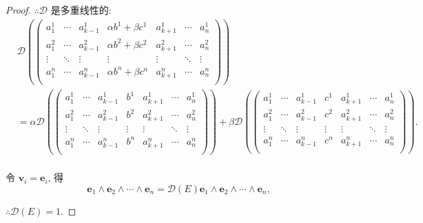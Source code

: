 \documentclass{ctexart}
\begin{document}
\begin{proof}
    $\therefore\mathcal{D}$ 是多重线性的:
    \begin{align*}
        & \mathcal{D}\left(\begin{pmatrix}
            a_1^1 & \cdots & a_{k-1}^1 & \alpha b^1+\beta c^1 & a_{k+1}^1 & \cdots & a_n^1 \\
            a_1^2 & \cdots & a_{k-1}^2 & \alpha b^2+\beta c^2 & a_{k+1}^2 & \cdots & a_n^2 \\
            \vdots & \ddots & \vdots & \vdots & \vdots & \ddots & \vdots \\
            a_1^n & \cdots & a_{k-1}^n & \alpha b^n+\beta c^n & a_{k+1}^n & \cdots & a_n^n \\
        \end{pmatrix}\right) \\
        & =\alpha\mathcal{D}\left(\begin{pmatrix}
            a_1^1 & \cdots & a_{k-1}^1 & b^1 & a_{k+1}^1 & \cdots & a_n^1 \\
            a_1^2 & \cdots & a_{k-1}^2 & b^2 & a_{k+1}^2 & \cdots & a_n^2 \\
            \vdots & \ddots & \vdots & \vdots & \vdots & \ddots & \vdots \\
            a_1^n & \cdots & a_{k-1}^n & b^n & a_{k+1}^n & \cdots & a_n^n \\
        \end{pmatrix}\right)+\beta\mathcal{D}\left(\begin{pmatrix}
            a_1^1 & \cdots & a_{k-1}^1 & c^1 & a_{k+1}^1 & \cdots & a_n^1 \\
            a_1^2 & \cdots & a_{k-1}^2 & c^2 & a_{k+1}^2 & \cdots & a_n^2 \\
            \vdots & \ddots & \vdots & \vdots & \vdots & \ddots & \vdots \\
            a_1^n & \cdots & a_{k-1}^n & c^n & a_{k+1}^n & \cdots & a_n^n \\
        \end{pmatrix}\right). \\
    \end{align*}

    令 $\boldsymbol{v}_i=\boldsymbol{e}_i$, 得
    \[\boldsymbol{e}_1\wedge\boldsymbol{e}_2\wedge\cdots\wedge\boldsymbol{e}_n=\mathcal{D}(E)\boldsymbol{e}_1\wedge\boldsymbol{e}_2\wedge\cdots\wedge\boldsymbol{e}_n,\]

    $\therefore\mathcal{D}(E)=1$.
\end{proof}
\end{document}
